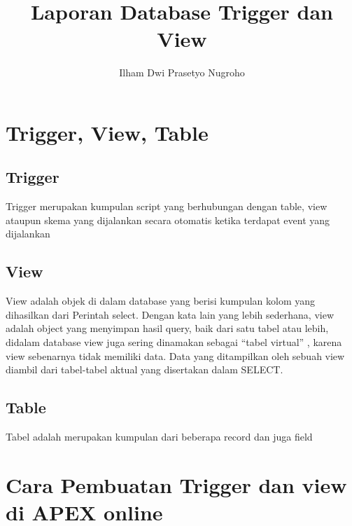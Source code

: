 \documentclass{article}
\title{Laporan Database Trigger dan View}
\author{Ilham Dwi Prasetyo Nugroho}
\begin{document}
\maketitle
\section{Trigger, View, Table}
\subsection{Trigger}
\par Trigger merupakan kumpulan script yang berhubungan dengan table, view ataupun skema yang dijalankan secara otomatis ketika terdapat event yang dijalankan
\subsection{View}
\par View adalah objek di dalam database yang berisi kumpulan kolom yang dihasilkan dari Perintah select. Dengan kata lain yang lebih sederhana, view adalah object yang menyimpan hasil query, baik dari satu tabel atau lebih, didalam database view juga sering dinamakan sebagai “tabel virtual” , karena view sebenarnya tidak memiliki data. Data yang ditampilkan oleh sebuah view diambil dari tabel-tabel aktual yang disertakan dalam SELECT.
\subsection{Table}
\par Tabel adalah merupakan kumpulan dari beberapa record dan juga field
\section{Cara Pembuatan Trigger dan view di APEX online}
\end{document}
